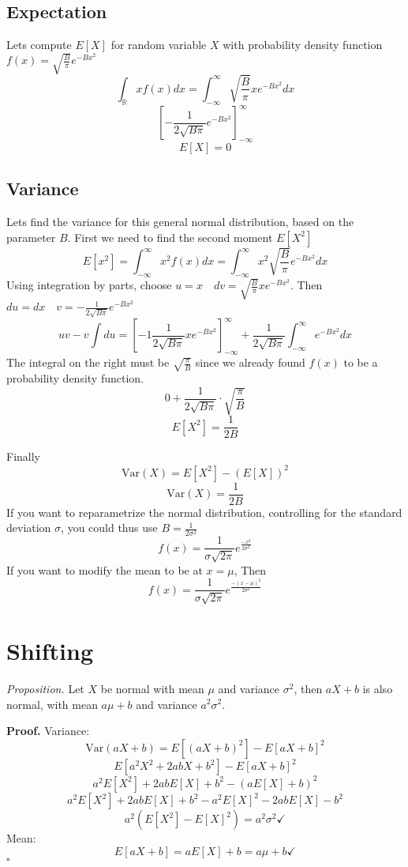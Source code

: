 \documentclass{article}
\begin{document}
\subsection{Expectation}

Lets compute $E[X]$ for random variable $X$ with probability density function $f(x) = \sqrt{\frac{B}{\pi}} e^{-Bx^2}$
\[\int_{\mathbb{R}} x f(x) dx = \int_{-\infty}^\infty \sqrt{\frac{B}{\pi}} x e^{-Bx^2}dx\]
\[\left[-\frac{1}{2\sqrt{B\pi}}e^{-Bx^2}\right]_{-\infty}^{\infty}\]
\[E[X] = 0\]

\subsection{Variance}

Lets find the variance for this general normal distribution, based on the parameter $B$.
First we need to find the second moment $E[X^2]$
\[E[x^2] = \int_{-\infty}^\infty x^2 f(x) dx = \int_{-\infty}^\infty x^2 \sqrt{\frac{B}{\pi}}e^{-Bx^2}dx\]
Using integration by parts, choose $u=x \quad dv = \sqrt{\frac{B}{\pi}} xe^{-Bx^2}$. Then $du = dx \quad v = -\frac{1}{2\sqrt{B\pi}}e^{-Bx^2}$
\[uv - v\int du = \left[-1\frac{1}{2\sqrt{B\pi}}xe^{-Bx^2}\right]^\infty_{-\infty} + \frac{1}{2\sqrt{B\pi}} \int^\infty_{-\infty} e^{-Bx^2} dx\]
The integral on the right must be $\sqrt{\frac{\pi}{B}}$ since we already found $f(x)$ to be a probability density function.
\[ 0 + \frac{1}{2\sqrt{B\pi}}\cdot \sqrt{\frac{\pi}{B}} \]
\[E[X^2] = \frac{1}{2B}\]

Finally
\[\text{Var}(X) = E[X^2] - (E[X])^2 \]
\[\text{Var}(X) = \frac{1}{2B}\]
If you want to reparametrize the normal distribution, controlling for the standard deviation $\sigma$, you could thus use $B = \frac{1}{2\sigma^2}$
\[f(x) = \frac{1}{\sigma \sqrt{2\pi}} e^\frac{-x^2}{2\sigma^2}\]
If you want to modify the mean to be at $x=\mu$, Then
\[f(x) = \frac{1}{\sigma \sqrt{2\pi}} e^\frac{-(x-\mu)^2}{2\sigma^2}\]

\section{Shifting}
\emph{Proposition.}
Let $X$ be normal with mean $\mu$ and variance $\sigma^2$, then $aX+b$ is also normal, with mean $a\mu + b$ and variance $a^2\sigma^2$.
\vspace{0.55em}

\textbf{Proof.}
Variance:
\[\text{Var}(aX+b) = E[(aX+b)^2] - E[aX+b]^2\]
\[E[a^2 X^2 + 2abX + b^2] - E[aX+b]^2\]
\[a^2 E[X^2]+ 2abE[X] + b^2 - (aE[X]+b)^2\]
\[a^2 E[X^2]+ 2abE[X] + b^2 - a^2 E[X]^2 - 2abE[X] - b^2\]
\[a^2 ( E[X^2] - E[X]^2 ) = a^2 \sigma^2 \checkmark \]
Mean:
\[E[aX+b] = aE[X]+b = a\mu + b \checkmark\]
$\square$
\end{document}
